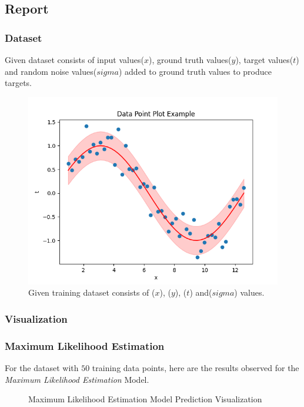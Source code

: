 \documentclass[12pt,twoside,a4paper]{article}
\begin{document}
\pagebreak
\subsection{Report}
\subsubsection{Dataset}
Given dataset consists of input values($x$), ground truth values($y$), target values($t$) and random noise values($sigma$) added to ground truth values to produce targets.
\begin{figure}[H]
    \centering
    \includegraphics[width=0.7\linewidth]{results/gt_data.png}
    \caption{Given training dataset consists of ($x$), ($y$), ($t$) and($sigma$) values.}
    \label{fig: DATASET}
\end{figure}
\pagebreak
\subsubsection{Visualization}

\subsubsection*{Maximum Likelihood Estimation}
For the dataset with $50$ training data points, here are the results observed for the \textit{Maximum Likelihood Estimation} Model.
\begin{figure}[H]
    \centering
    \hspace{0mm}
    \hspace{0mm}
    \caption{Maximum Likelihood Estimation Model Prediction Visualization}
\end{figure}
\end{document}
